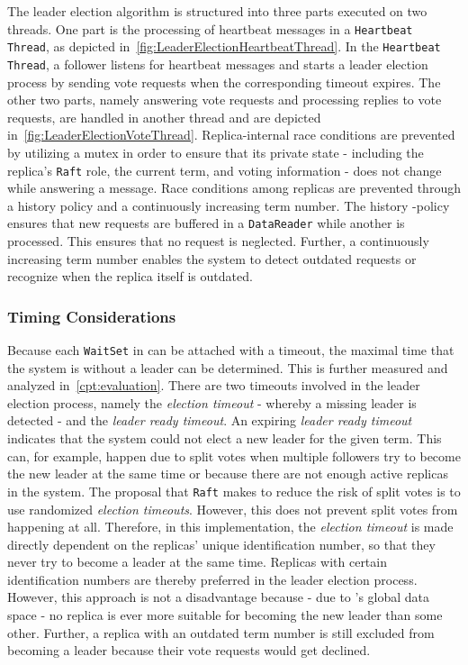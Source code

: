 The leader election algorithm is structured into three parts executed on two  threads.
One part is the processing of heartbeat messages in a \texttt{Heartbeat Thread}, as depicted in~\autoref{fig:LeaderElectionHeartbeatThread}.
In the \texttt{Heartbeat Thread}, a follower listens for heartbeat messages and starts a leader election process by sending vote requests when the corresponding timeout expires.
The other two parts, namely answering vote requests and processing replies to vote requests, are handled in another thread and are depicted in~\autoref{fig:LeaderElectionVoteThread}.
Replica-internal race conditions are prevented by utilizing a mutex in order to ensure that its private state - including the replica's \texttt{Raft} role, the current term, and voting information - does not change while answering a message.
Race conditions among replicas are prevented through a history  policy and a continuously increasing term number.
The history -policy ensures that new requests are buffered in a \texttt{DataReader} while another is processed.
This ensures that no request is neglected.
Further, a continuously increasing term number enables the system to detect outdated requests or recognize when the replica itself is outdated.

\subsubsection{Timing Considerations}
\label{subsub:timeConsiderations}

Because each \texttt{WaitSet} in  can be attached with a timeout, the maximal time that the system is without a leader can be determined.
This is further measured and analyzed in~\autoref{cpt:evaluation}.
There are two timeouts involved in the leader election process, namely the \textit{election timeout} - whereby a missing leader is detected - and the \textit{leader ready timeout}.
An expiring \textit{leader ready timeout} indicates that the system could not elect a new leader for the given term.
This can, for example, happen due to split votes when multiple followers try to become the new leader at the same time or because there are not enough active replicas in the system.
The proposal that \texttt{Raft} makes to reduce the risk of split votes is to use randomized \textit{election timeouts}.
However, this does not prevent split votes from happening at all.
Therefore, in this implementation, the \textit{election timeout} is made directly dependent on the replicas' unique identification number, so that they never try to become a leader at the same time.
Replicas with certain identification numbers are thereby preferred in the leader election process.
However, this approach is not a disadvantage because - due to 's global data space - no replica is ever more suitable for becoming the new leader than some other.
Further, a replica with an outdated term number is still excluded from becoming a leader because their vote requests would get declined.

